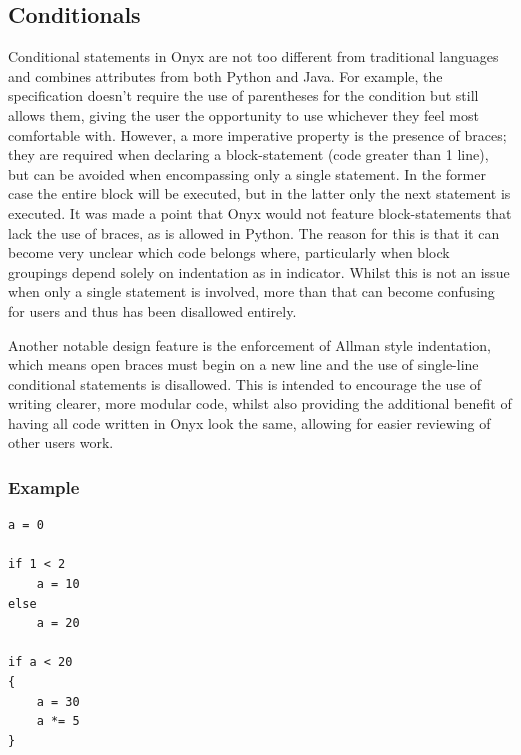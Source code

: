 \documentclass[
]{report}
\begin{document}
\subsection{Conditionals}
Conditional \glspl{statement} in Onyx are not too different from traditional
languages and combines attributes from both Python and Java. For
example, the specification doesn't require the use of parentheses for
the condition but still allows them, giving the user the opportunity to
use whichever they feel most comfortable with. However, a more
imperative property is the presence of braces; they are required when
declaring a \gls{block-statement} (code greater than 1 line), but can be
avoided when encompassing only a single \gls{statement}. In the former case
the entire block will be executed, but in the latter only the next
\gls{statement} is executed. It was made a point that Onyx would not feature
\glspl{block-statement} that lack the use of braces, as is allowed in Python.
The reason for this is that it can become very unclear which code
belongs where, particularly when block groupings depend solely on
indentation as in indicator. Whilst this is not an issue when only a
single \gls{statement} is involved, more than that can become confusing for
users and thus has been disallowed entirely.

Another notable design feature is the enforcement of Allman style
indentation, which means open braces must begin on a new line and the
use of single-line conditional \glspl{statement} is disallowed. This is
intended to encourage the use of writing clearer, more modular code,
whilst also providing the additional benefit of having all code written
in Onyx look the same, allowing for easier reviewing of other users
work.

\subsubsection{Example}
\begin{verbatim}
a = 0

if 1 < 2
    a = 10
else
    a = 20

if a < 20
{
    a = 30
    a *= 5
}
\end{verbatim}
\end{document}
